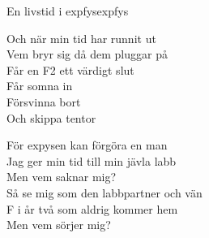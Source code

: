 \begin{song}{En livstid i expfys}{expfys}
\begin{vers}
Och när min tid har runnit ut\\
Vem bryr sig då dem pluggar på\\
Får en F2 ett värdigt slut\\
Får somna in\\
Försvinna bort\\
Och skippa tentor\\
\end{vers}

\begin{vers}
\repopen För expysen kan förgöra en man\\
Jag ger min tid till min jävla labb\\
Men vem saknar mig?\\
Så se mig som den labbpartner och vän\\
F i år två som aldrig kommer hem\\
Men vem sörjer mig?\repclose\\
\end{vers}
\end{song}